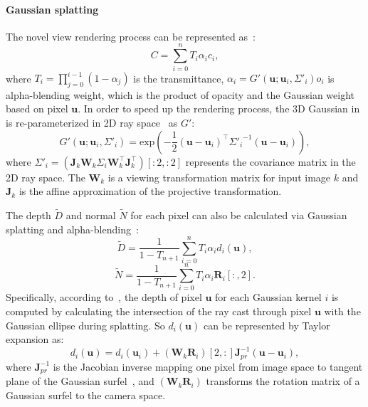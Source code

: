 \paragraph{Gaussian splatting\quad}
The novel view rendering process can be represented as~\citep{kerbl20233d}: 
\begin{equation}
    C=\sum_{i=0}^nT_i\alpha_ic_i,
\label{eq:gs_render}
\end{equation}
where $T_i=\prod_{j=0}^{i-1}(1-\alpha_j)$ is the transmittance, $\alpha_i = G'(\textbf{u};\textbf{u}_i,\Sigma'_i)o_i$ 
is alpha-blending weight, which is the product of opacity and the Gaussian weight based on pixel $\textbf{u}$. 
In order to speed up the rendering process, the 3D Gaussian in  
is re-parameterized in 2D ray space~\citep{zwicker2002ewa} as $G'$:
\begin{equation}
    G'(\textbf{u};\textbf{u}_i,\Sigma'_i)=\text{exp}(-\frac{1}{2}(\textbf{u}-\textbf{u}_i)^\top {\Sigma'_i}^{-1}(\textbf{u}-\textbf{u}_i)),
\end{equation}
where ${\Sigma'_i}= (\textbf{J}_k\textbf{W}_k\Sigma_i\textbf{W}_k^\top\textbf{J}_k^\top)[:2,:2]$ represents the covariance matrix in the 2D ray space. The $\textbf{W}_k$
is a viewing transformation matrix for input image $k$ and $\textbf{J}_k$ is the affine approximation of the projective transformation.


The depth $\tilde{D}$ and normal $\tilde{N}$ for each pixel can also be
calculated via Gaussian splatting and alpha-blending~\citep{dai2024high}:
\begin{equation}
        \tilde{D}=\frac{1}{1-T_{n+1}}\sum_{i=0}^{n}T_i\alpha_id_i(\textbf{u}),
\end{equation}
\begin{equation}
        \tilde{N}=\frac{1}{1-T_{n+1}}\sum_{i=0}^{n}T_i\alpha_i\textbf{R}_i[:,2].
\label{eq:gs_normal}
\end{equation}
Specifically, according to~\gs, the depth of pixel $\textbf{u}$ for each Gaussian kernel $i$
is computed by calculating the intersection of the ray cast through pixel $\textbf{u}$ 
with the Gaussian ellipse during splatting. So $d_i(\textbf{u})$ can be represented by Taylor expansion as:
\begin{equation}
    d_i(\textbf{u}) = d_i(\textbf{u}_i) + (\textbf{W}_k\textbf{R}_i)[2,:]\textbf{J}_{pr}^{-1}(\textbf{u}-\textbf{u}_i),
\end{equation}
where $\textbf{J}_{pr}^{-1}$ is the Jacobian inverse mapping one pixel from image space to tangent plane of the Gaussian surfel~\citep{zwicker2001surface}, and $(\textbf{W}_k\textbf{R}_i)$ transforms the rotation matrix of a Gaussian surfel
to the camera space.

